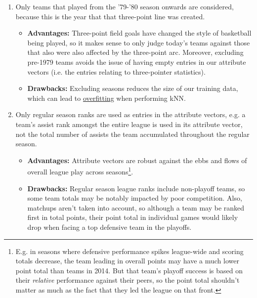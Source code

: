 \documentclass[a4paper,11pt]{article}
\begin{document}
\begin{enumerate}

\item Only teams that played from the '79-'80 season onwards are considered, because this is the year that that three-point line was created.
\begin{itemize}
\item \textbf{Advantages:} Three-point field goals have changed the style of basketball being played, so it makes sense to only judge today's teams against those that also were also affected by the three-point arc. Moreover, excluding pre-1979 teams avoids the issue of having empty entries in our attribute vectors (i.e. the entries relating to three-pointer statistics).
\item \textbf{Drawbacks:} Excluding seasons reduces the size of our training data, which can lead to \textcolor{blue}{\underline{\href{http://en.wikipedia.org/wiki/Overfitting}{overfitting}}} when performing kNN.
\end{itemize}

\item Only regular season ranks are used as entries in the attribute vectors, e.g. a team's assist rank amongst the entire league is used in its attribute vector, not the total number of assists the team accumulated throughout the regular season.
\begin{itemize}
\item \textbf{Advantages:} Attribute vectors are robust against the ebbs and flows of overall league play across seasons\footnote{E.g. in seasons where defensive performance spikes league-wide and scoring totals decrease, the team leading in overall points may have a much lower point total than teams in 2014. But that team's playoff success is based on their \emph{relative} performance against their peers, so the point total shouldn't matter as much as the fact that they led the league on that front.}.
\item \textbf{Drawbacks:} Regular season league ranks include non-playoff teams, so some team totals may be notably impacted by poor competition. Also, matchups aren't taken into account, so although a team may be ranked first in total points, their point total in individual games would likely drop when facing a top defensive team in the playoffs. 
\end{itemize}


\end{enumerate}
\end{document}
